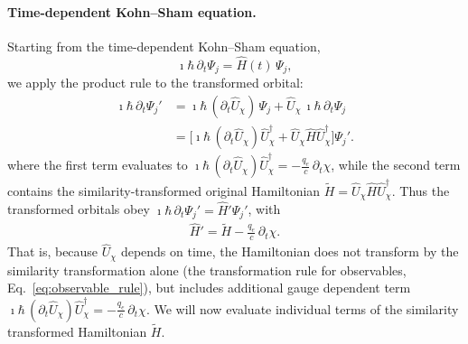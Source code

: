 \paragraph{Time-dependent Kohn--Sham equation.}
Starting from the time-dependent Kohn--Sham equation,
\begin{equation}
  \imath\hbar\,\partial_t\Psi_j = \hat H(t)\,\Psi_j ,
  \label{eq:tdks_general}
\end{equation}
we apply the product rule to the transformed orbital:
\begin{equation}
\begin{split}
  \imath\hbar\,\partial_t\Psi_j'
  &= \imath\hbar\,(\partial_t\hat U_\chi)\,\Psi_j
   + \hat U_\chi\,\imath\hbar\,\partial_t\Psi_j \\
  &= \Big[\imath\hbar\,(\partial_t\hat U_\chi)\hat U_\chi^\dagger
   + \hat U_\chi\hat H\hat U_\chi^\dagger\Big]\Psi_j' .
\end{split}
\label{eq:tdks_product_rule}
\end{equation}
where the first term evaluates to $\imath\hbar\,(\partial_t\hat U_\chi)\hat U_\chi^\dagger =  - \frac{q_e}{c}\,\partial_t\chi$, 
while the second term contains the similarity-transformed original Hamiltonian
 $\tilde H = \hat U_\chi\hat H\hat U_\chi^\dagger$.
Thus the transformed orbitals obey $\imath\hbar\,\partial_t\Psi_j' = \hat H'\Psi_j'$, with
\begin{equation}
\begin{split}
\hat H' %
        = \tilde H  - \frac{q_e}{c}\,\partial_t\chi .
\end{split}
	\label{eq:H_transformed}
\end{equation}
That is, because $\hat U_\chi$ depends on time, the Hamiltonian does not transform
by the similarity transformation alone (the transformation rule for observables, Eq.~\eqref{eq:observable_rule}), 
but includes  additional gauge dependent term 
$\imath\hbar\,(\partial_t\hat U_\chi)\hat U_\chi^\dagger =  - \frac{q_e}{c}\,\partial_t\chi$.
We will now evaluate individual terms  of the similarity transformed   Hamiltonian $\tilde H$.

